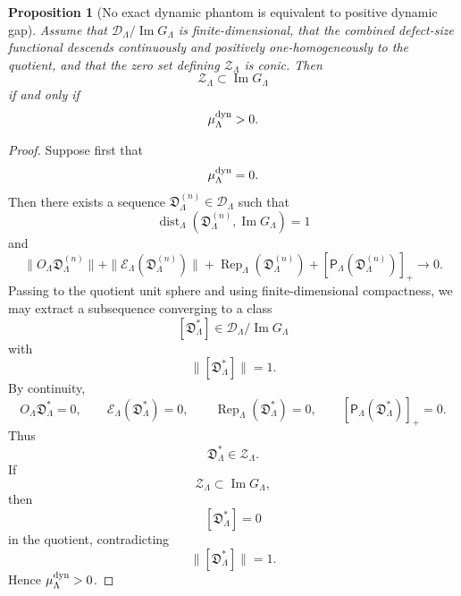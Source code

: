 \documentclass[11pt]{article}
\numberwithin{equation}{section}
\newtheorem{proposition}[theorem]{Proposition}
\begin{document}
\begin{proposition}[No exact dynamic phantom is equivalent to positive dynamic gap]
\label{prop:no-phantom-gap-equivalence}
Assume that \(\mathcal D_\Lambda/\operatorname{Im}G_\Lambda\) is
finite-dimensional, that the combined defect-size functional descends
continuously and positively one-homogeneously to the quotient, and that the
zero set defining \(\mathcal Z_\Lambda\) is conic.  Then
\[
        \mathcal Z_\Lambda
        \subset
        \operatorname{Im}G_\Lambda
\]
if and only if
\[
        \mu_\Lambda^{\rm dyn}>0.
\]
\end{proposition}

\begin{proof}
Suppose first that
\[
        \mu_\Lambda^{\rm dyn}=0.
\]
Then there exists a sequence
\(\mathfrak D_\Lambda^{(n)}\in\mathcal D_\Lambda\) such that
\[
        \operatorname{dist}_\Lambda
        (\mathfrak D_\Lambda^{(n)},\operatorname{Im}G_\Lambda)=1
\]
and
\[
        \|O_\Lambda\mathfrak D_\Lambda^{(n)}\|
        +
        \|\mathcal E_\Lambda(\mathfrak D_\Lambda^{(n)})\|
        +
        \operatorname{Rep}_\Lambda(\mathfrak D_\Lambda^{(n)})
        +
        [\mathsf P_\Lambda(\mathfrak D_\Lambda^{(n)})]_+
        \longrightarrow 0 .
\]
Passing to the quotient unit sphere and using finite-dimensional
compactness, we may extract a subsequence converging to a class
\[
        [\mathfrak D_\Lambda^\ast]
        \in
        \mathcal D_\Lambda/\operatorname{Im}G_\Lambda
\]
with
\[
        \|[\mathfrak D_\Lambda^\ast]\|=1.
\]
By continuity,
\[
        O_\Lambda\mathfrak D_\Lambda^\ast=0,
        \qquad
        \mathcal E_\Lambda(\mathfrak D_\Lambda^\ast)=0,
        \qquad
        \operatorname{Rep}_\Lambda(\mathfrak D_\Lambda^\ast)=0,
        \qquad
        [\mathsf P_\Lambda(\mathfrak D_\Lambda^\ast)]_+=0.
\]
Thus
\[
        \mathfrak D_\Lambda^\ast\in\mathcal Z_\Lambda.
\]
If
\[
        \mathcal Z_\Lambda\subset\operatorname{Im}G_\Lambda,
\]
then
\[
        [\mathfrak D_\Lambda^\ast]=0
\]
in the quotient, contradicting
\[
        \|[\mathfrak D_\Lambda^\ast]\|=1.
\]
Hence \(\mu_\Lambda^{\rm dyn}>0\).


\end{proof}
\end{document}
